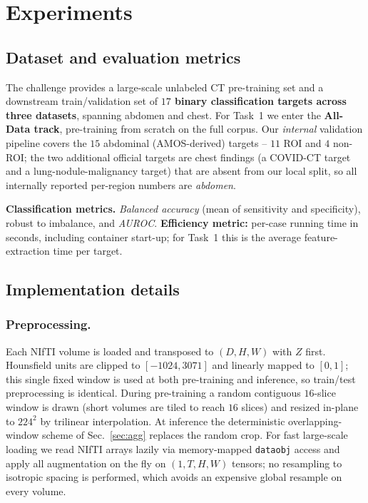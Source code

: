 \documentclass[runningheads]{llncs}
\begin{document}
\section{Experiments}

\subsection{Dataset and evaluation metrics}
The challenge provides a large-scale unlabeled CT pre-training set and a
downstream train/validation set of \textbf{$17$ binary classification targets
across three datasets}, spanning abdomen and chest. For Task~1 we enter the
\textbf{All-Data track}, pre-training from scratch on the full corpus. Our
\emph{internal} validation pipeline covers the $15$ abdominal (AMOS-derived)
targets -- $11$ ROI and $4$ non-ROI; the two additional official targets are
chest findings (a COVID-CT target and a lung-nodule-malignancy target) that are
absent from our local split, so all internally reported per-region numbers are
\emph{abdomen}.

\noindent\textbf{Classification metrics.}
\emph{Balanced accuracy} (mean of sensitivity and specificity), robust to
imbalance, and \emph{AUROC}. \textbf{Efficiency metric:} per-case running time
in seconds, including container start-up; for Task~1 this is the average
feature-extraction time per target.

\subsection{Implementation details}

\subsubsection{Preprocessing.}
\label{sec:preproc}
Each NIfTI volume is loaded and transposed to $(D,H,W)$ with $Z$ first. Hounsfield
units are clipped to $[-1024, 3071]$ and linearly mapped to $[0,1]$; this single
fixed window is used at both pre-training and inference, so train/test
preprocessing is identical. During pre-training a random contiguous $16$-slice
window is drawn (short volumes are tiled to reach $16$ slices) and resized
in-plane to $224^2$ by trilinear interpolation. At inference the deterministic
overlapping-window scheme of Sec.~\ref{sec:agg} replaces the random crop. For
fast large-scale loading we read NIfTI arrays lazily via memory-mapped
\texttt{dataobj} access and apply all augmentation on the fly on $(1,T,H,W)$
tensors; no resampling to isotropic spacing is performed, which avoids an
expensive global resample on every volume.
\end{document}
